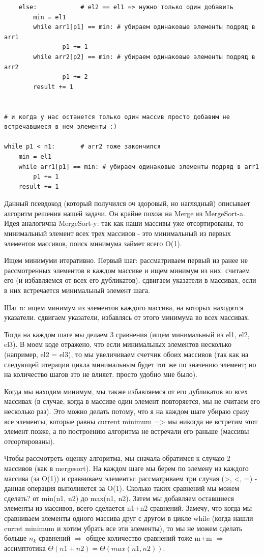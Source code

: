 \documentclass{article}
\begin{document}
\begin{verbatim}
    else:            # el2 == el1 => нужно только один добавить
        min = el1
        while arr1[p1] == min: # убираем одинаковые элементы подряд в arr1
                p1 += 1
        while arr2[p2] == min: # убираем одинаковые элементы подряд в arr2
                p1 += 2
        result += 1


# и когда у нас останется только один массив просто добавим не встречавшиеся в нем элементы :)

while p1 < n1:       # arr2 тоже закончился
    min = el1
    while arr1[p1] == min: # убираем одинаковые элементы подряд в arr1
        p1 += 1
    result += 1
\end{verbatim}

Данный псевдокод (который получился оч здоровый, но наглядный) описывает алгоритм решения нашей задачи. Он крайне похож на Merge из MergeSort-a. Идея аналогична MergeSort-y: так как наши массивы уже отсортированы, то минимальный элемент всех трех массивов - это минимальный из первых элементов массивов, поиск минимума займет всего O(1).

Ищем минимуми итеративно. 
Первый шаг: рассматриваем первый из ранее не рассмотренных элементов в каждом массиве и ищем минимум из них. считаем его (и избавляемся от всех его дубликатов). сдвигаем указатели в массивах, если в них встречается минимальный элемент шага.

Шаг n: ищем минимум из элементов каждого массива, на которых находятся указатели. сдвигаем указатели, избавлясь от этого минимума во всех массивах.

Тогда на каждом шаге мы делаем 3 сравнения (ищем минимальный из el1, el2, el3). В моем коде отражено, что если минимальных элементов несколько (например, el2 = el3), то мы увеличиваем счетчик обоих массивов (так как на следующей итерации  цикла минимальным будет тот же по значению элемент; но на количество шагов это не влияет. просто удобно мне было). 

Когда мы находим минимум, мы также избавляемся от его дубликатов во всех массивах (в случае, когда в массиве один элемент повторяется, мы не считаем его несколько раз). Это можно делать потому, что я на каждом шаге убираю сразу все элементы, которые равны current minimum => мы никогда не встретим этот элемент позже, а по построению алгоритма не встречали его раньше (массивы отсортированы).


Чтобы рассмотреть оценку алгоритма, мы сначала обратимся к случаю 2 массивов (как в mergesort). На каждом шаге мы берем по элемену из каждого массива (за O(1)) и сравниваем элементы: рассматриваем три случая (>, <, =) - данная операция выполняется за O(1). Сколько таких сравнений мы можем сделать? от min(n1, n2) до max(n1, n2). Затем мы добавляем оставшиеся элементы из массивов, всего сделается n1+n2 сравнений. Замечу, что когда мы сравниваем элементы одного массива друг с другом в цикле while (когда нашли curret minimum и хотим убрать все эти элементы), то мы не можем сделать больше $n_k$ сравнений $\Rightarrow$ общее количество сравнений тоже m+m $\Rightarrow$ ассимптотика $\Theta(n1 + n2) = \Theta(max(n1, n2))$.
\end{document}
